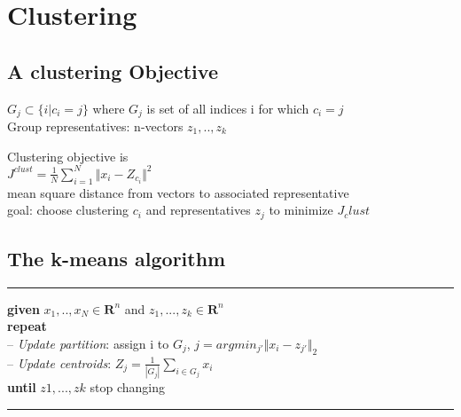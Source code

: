 \section{Clustering}
\subsection{A clustering Objective}
$G_{j} \subset \{ i| c_{i}=j \}$ where $G_{j}$ is set of all indices i for which $c_{i}=j$\\
\textbullet Group representatives: n-vectors $z_1,..,z_k$

\textbullet Clustering objective is\\
$J^{clust} = \frac{1}{N} \sum_{i=1}^N\Vert x_i - Z_{c_i}\Vert^2$\\
\textbullet mean square distance from vectors to associated representative\\
\textbullet goal: choose clustering $c_i$ and representatives $z_j$
to minimize $J_clust$
\subsection{The k-means algorithm}
\rule{\linewidth}{0.4pt}
\textbf{given} $x_1,..,x_N \in \textbf{R}^n$ and $z_1,...,z_k \in \textbf{R}^n$\\
\textbf{repeat}\\
-- \textit{Update partition}: assign i to $G_j$, $j = argmin_{j'} \Vert x_i - z_{j'} \Vert_2$\\
-- \textit{Update centroids}: $Z_j = \frac{1}{|G_j|}\sum_{i \in G_j}x_i$\\
\textbf{until} $z1,...,zk$ stop changing\\
\rule{\linewidth}{0.4pt}


